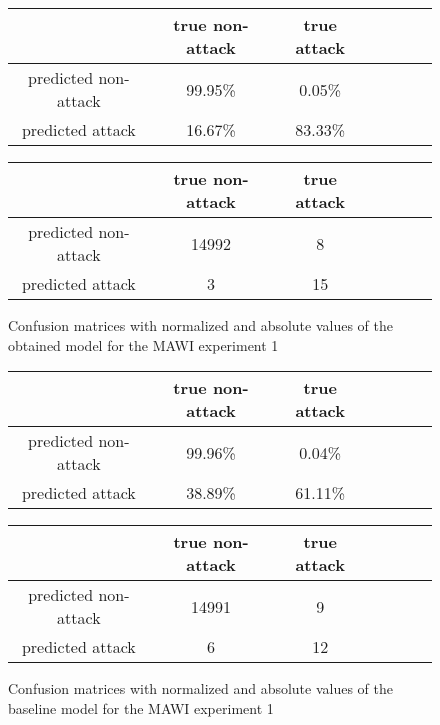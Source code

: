 \documentclass{article}
\begin{document}
\begin{figure}[h!]
    \centering
    \begin{tabular}{ |c|c|c|c|c|c|c| }
     \hline
      & true non-attack & true attack \\
     \hline
     predicted non-attack & 99.95\% & 0.05\% \\
     \hline
     predicted attack & 16.67\% & 83.33\% \\
     \hline
    \end{tabular}

    \vspace{0.2cm}

    \centering
    \begin{tabular}{ |c|c|c|c|c|c|c| }
     \hline
      & true non-attack & true attack \\
     \hline
     predicted non-attack & 14992 & 8 \\
     \hline
     predicted attack & 3 & 15 \\
     \hline
    \end{tabular}
    \caption{Confusion matrices with normalized and absolute values of the obtained model for the MAWI experiment 1}
    \label{fig-mawi-exp1-transcriptions}
\end{figure}


\begin{figure}[h!]
    \centering
    \begin{tabular}{ |c|c|c|c|c|c|c| }
     \hline
      & true non-attack & true attack \\
     \hline
     predicted non-attack & 99.96\% & 0.04\% \\
     \hline
     predicted attack & 38.89\% & 61.11\% \\
     \hline
    \end{tabular}

    \vspace{0.2cm}

    \centering
    \begin{tabular}{ |c|c|c|c|c|c|c| }
     \hline
      & true non-attack & true attack \\
     \hline
     predicted non-attack & 14991 & 9 \\
     \hline
     predicted attack & 6 & 12 \\
     \hline
    \end{tabular}
    \caption{Confusion matrices with normalized and absolute values of the baseline model for the MAWI experiment 1}
    \label{fig-mawi-exp1-baseline}
\end{figure}
\end{document}
